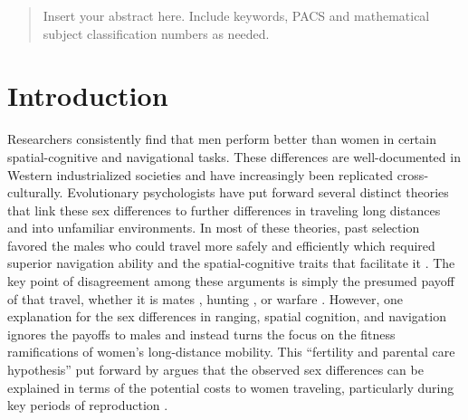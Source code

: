 
\date{Received: date / Accepted: date}


\maketitle

\begin{abstract}
Insert your abstract here. Include keywords, PACS and mathematical
subject classification numbers as needed.
\end{abstract}

\section{Introduction}
\label{sec:1}
Researchers consistently find  that men perform better than women in certain spatial-cognitive and navigational tasks.  These differences are well-documented in Western industrialized societies and have increasingly been replicated cross-culturally.  Evolutionary psychologists have put forward several distinct theories that link these sex differences to further differences in traveling long distances and into unfamiliar environments.  In most of these theories, past selection favored the males who could travel more safely and efficiently which required superior navigation ability and the spatial-cognitive traits that facilitate it \citep{jones2003evolution}.  The key point of disagreement among these arguments is simply the presumed payoff of that travel, whether it is mates \citep{gaulin1992evolution}, hunting \citep{eals1994hunter}, or warfare \citep{geary1995sexual}.  However, one explanation for the sex differences in ranging, spatial cognition, and navigation ignores the payoffs to males and instead turns the focus on the fitness ramifications of women's long-distance mobility.  This ``fertility and parental care hypothesis'' put forward by \citet{sherry1997evolution} argues that the observed sex differences can be explained in terms of the potential costs to women traveling, particularly during key periods of reproduction \citep{ecuyer2004have}.

